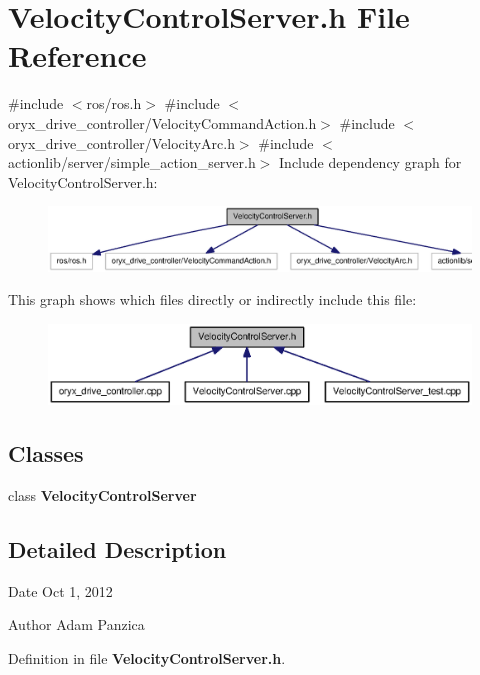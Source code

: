 \section{\-Velocity\-Control\-Server.\-h \-File \-Reference}
\label{VelocityControlServer_8h}
{\ttfamily \#include $<$ros/ros.\-h$>$}\*
{\ttfamily \#include $<$oryx\-\_\-drive\-\_\-controller/\-Velocity\-Command\-Action.\-h$>$}\*
{\ttfamily \#include $<$oryx\-\_\-drive\-\_\-controller/\-Velocity\-Arc.\-h$>$}\*
{\ttfamily \#include $<$actionlib/server/simple\-\_\-action\-\_\-server.\-h$>$}\*
\-Include dependency graph for \-Velocity\-Control\-Server.\-h\-:
\nopagebreak
\begin{figure}[H]
\begin{center}
\leavevmode
\includegraphics[width=350pt]{VelocityControlServer_8h__incl}
\end{center}
\end{figure}
\-This graph shows which files directly or indirectly include this file\-:
\nopagebreak
\begin{figure}[H]
\begin{center}
\leavevmode
\includegraphics[width=350pt]{VelocityControlServer_8h__dep__incl}
\end{center}
\end{figure}
\subsection*{\-Classes}
\begin{DoxyCompactItemize}
\item 
class {\bf \-Velocity\-Control\-Server}
\end{DoxyCompactItemize}


\subsection{\-Detailed \-Description}
\begin{DoxyDate}{\-Date}
\-Oct 1, 2012 
\end{DoxyDate}
\begin{DoxyAuthor}{\-Author}
\-Adam \-Panzica 
\end{DoxyAuthor}


\-Definition in file {\bf \-Velocity\-Control\-Server.\-h}.

